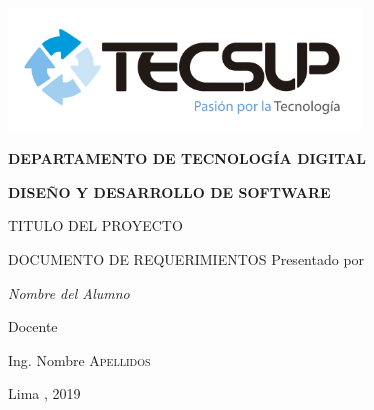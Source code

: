 \begin{titlepage}
	\centering
	\includegraphics[width=0.70\textwidth]{img/logo_tecsup_final}\par\vspace{1cm}
	\vspace{0.30cm}	
	{\scshape\large\bfseries DEPARTAMENTO DE TECNOLOG\'IA DIGITAL \par}
	\vspace{0.60cm}	
	{\scshape\large\bfseries DISEÑO Y DESARROLLO DE SOFTWARE  \par}
	\vspace{2.00cm}		
	{\large\large TITULO DEL PROYECTO \par}
	{\large\itshape{}}
	\vspace{0.60cm}
	{\scshape\large DOCUMENTO DE REQUERIMIENTOS }
	\vspace{0.60cm}
	\vfill
	Presentado por \par
	{\large\itshape { Nombre del Alumno }\par}
	\vspace{0.30cm}
	\vfill
	Docente \par
	Ing. Nombre  \textsc{ Apellidos}
	
  \vspace{0.30cm}
	\vfill
        {\large Lima , 2019 \par}
\end{titlepage}


